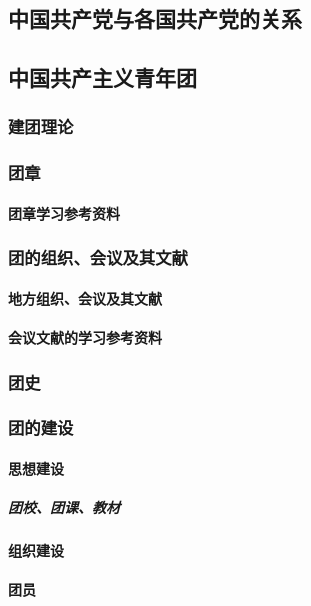 \documentclass[UTF8]{../RepresentationUniverse}
\begin{document}
    \subsection{中国共产党与各国共产党的关系}
    \subsection{中国共产主义青年团}
        \subsubsection{建团理论}
        \subsubsection{团章}
            \paragraph{团章学习参考资料}
        \subsubsection{团的组织、会议及其文献}
            \paragraph{地方组织、会议及其文献}
            \paragraph{会议文献的学习参考资料}

        \subsubsection{团史}
        \subsubsection{团的建设}
            \paragraph{思想建设}
                \subparagraph{团校、团课、教材}
            \paragraph{组织建设}
            \paragraph{团员}
\end{document}
